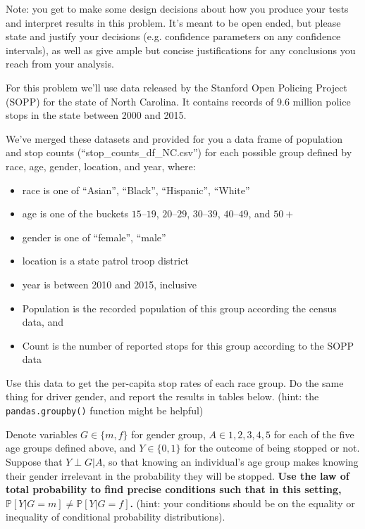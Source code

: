 \documentclass[preview]{standalone}
\begin{document}
Note: you get to make some design decisions about how you produce your tests and interpret results in this problem. It's meant to be open ended, but please state and justify your decisions (e.g. confidence parameters on any confidence intervals), as well as give ample but concise justifications for any conclusions you reach from your analysis.




For this problem we’ll use data released by the Stanford Open Policing Project (SOPP) for the state of North Carolina. It contains records of 9.6 million police stops in the state between 2000 and 2015. 

 \begin{Parts}
 \Part We've merged these datasets and provided for you a data frame of population and stop counts (``stop\_counts\_df\_NC.csv'') for each possible group defined by race, age, gender, location, and year, where:
\begin{itemize}
\item race is one of ``Asian”, ``Black”, ``Hispanic”, ``White”
\item age is one of the buckets $15–19$, $20–29$, $30–39$, $40–49$, and $50+$
\item gender is one of ``female”, ``male”
\item location is a state patrol troop district
\item year is between 2010 and 2015, inclusive
\item Population is the recorded population of this group according the census data, and
\item Count is the number of reported stops for this group according to the SOPP data
\end{itemize}

Use this data to get the per-capita stop rates of each race group. Do the same thing for driver gender, and report the results in tables below.  (hint: the \texttt{pandas.groupby()} function might be helpful)



\Part Denote variables $G \in \{m,f\}$ for gender group, $A \in {1,2,3,4,5}$ for each of the five age groups defined above, and $Y \in \{0,1\}$ for the outcome of being stopped or not. Suppose that $Y \perp G | A$, so that knowing an individual's age group makes knowing their gender irrelevant in the probability they will be stopped. \textbf{Use the law of total probability to find precise conditions such that in this setting, $\mathbb{P}[Y | G = m] \not=\mathbb{P}[Y | G = f]$. } (hint: your conditions should be on the equality or inequality of conditional probability distributions). \\


\end{Parts}
\end{document}
